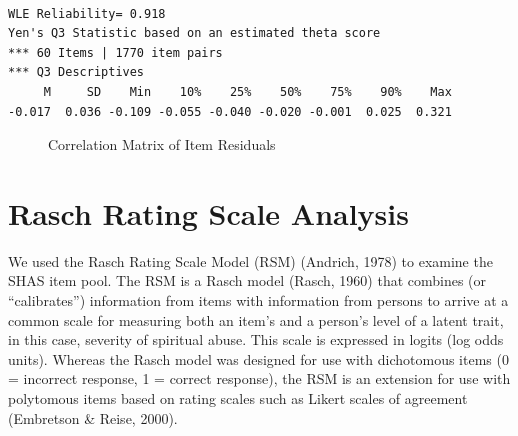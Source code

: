 \documentclass[
  letterpaper,
]{article}
\begin{document}
\begin{verbatim}

WLE Reliability= 0.918 
Yen's Q3 Statistic based on an estimated theta score 
*** 60 Items | 1770 item pairs
*** Q3 Descriptives
     M     SD    Min    10%    25%    50%    75%    90%    Max 
-0.017  0.036 -0.109 -0.055 -0.040 -0.020 -0.001  0.025  0.321 
\end{verbatim}

\begin{figure}


\caption{\label{fig-q3}Correlation Matrix of Item Residuals}

\end{figure}%

\section*{Rasch Rating Scale
Analysis}\label{rasch-rating-scale-analysis}


We used the Rasch Rating Scale Model (RSM) (Andrich, 1978) to examine
the SHAS item pool. The RSM is a Rasch model (Rasch, 1960) that combines
(or ``calibrates'') information from items with information from persons
to arrive at a common scale for measuring both an item's and a person's
level of a latent trait, in this case, severity of spiritual abuse. This
scale is expressed in logits (log odds units). Whereas the Rasch model
was designed for use with dichotomous items (0 = incorrect response, 1 =
correct response), the RSM is an extension for use with polytomous items
based on rating scales such as Likert scales of agreement (Embretson \&
Reise, 2000).
\end{document}

